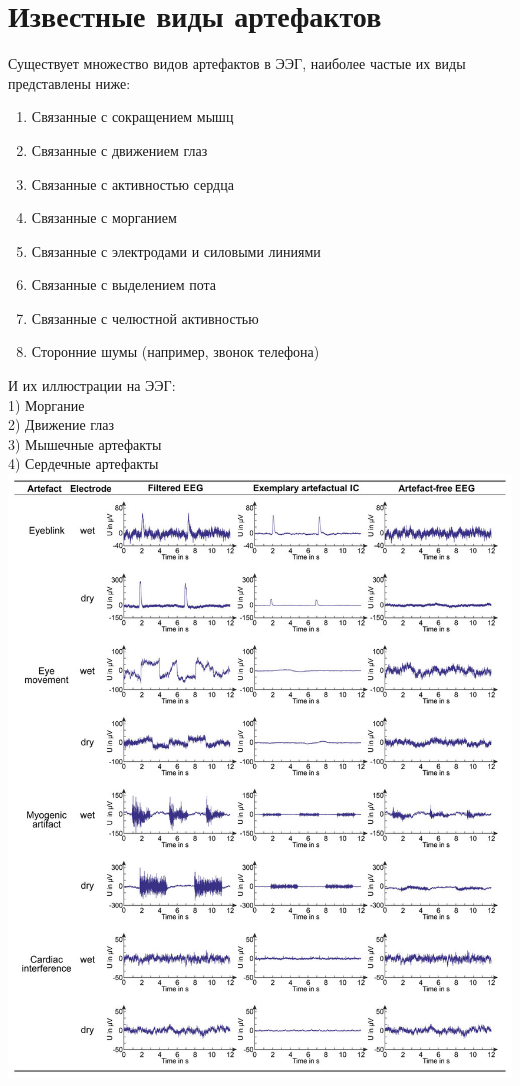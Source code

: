 \documentclass[12pt, a4paper, titlepage]{extreport}
\begin{document}
	\section*{Известные виды артефактов}
	Существует множество видов артефактов в ЭЭГ, наиболее частые их виды представлены ниже:
		\begin{enumerate}
		\item Связанные с сокращением мышц
		\item Связанные с движением глаз
		\item Связанные с активностью сердца
		\item Связанные с морганием
		\item Связанные с электродами и силовыми линиями
		\item Связанные с выделением пота
		\item Связанные с челюстной активностью
		\item Сторонние шумы (например, звонок телефона)
	\end{enumerate}
	И их иллюстрации на ЭЭГ:\\
	1) Моргание \\
	2) Движение глаз\\
	3) Мышечные артефакты\\
	4) Сердечные артефакты\\
	\includegraphics[scale=2]{artifact_types.jpg}\\
\end{document}
